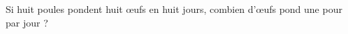 
\begin{exercice}\label{exo2smath-0117}

    Si huit poules pondent huit œufs en huit jours, combien d'œufs pond une pour par jour ?

\end{exercice}
